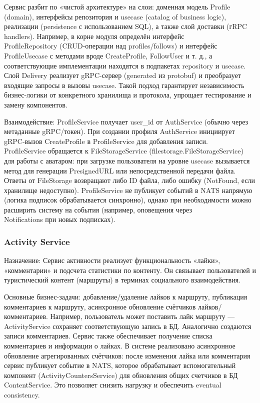 Сервис разбит по «чистой архитектуре» на слои: доменная модель Profile (domain), интерфейсы репозитория и usecase (catalog of business logic), реализации (persistence с использованием SQL), а также слой доставки (гRPC handlers). Например, в корне модуля определён интерфейс \\ ProfileRepository (CRUD-операции над profiles/follows) и интерфейс ProfileUsecase с методами вроде CreateProfile, FollowUser и т. д., а соответствующие имплементации находятся в подпакетах repository и usecase. Слой Delivery реализует gRPC-сервер (generated из protobuf) и преобразует входящие запросы в вызовы usecase. Такой подход гарантирует независимость бизнес-логики от конкретного хранилища и протокола, упрощает тестирование и замену компонентов.

Взаимодействие: ProfileService получает user\_id от AuthService (обычно через метаданные gRPC/токен). При создании профиля AuthService инициирует gRPC-вызов CreateProfile в ProfileService для добавления записи. \\ ProfileService обращается к FileStorageService (filestorage.FileStorageService) для работы с аватаром: при загрузке пользователя на уровне usecase вызывается метод для генерации PresignedURL или непосредственной передачи файла. Ответы от FileStorage возвращают либо ID файла, либо ошибку (NotFound, если хранилище недоступно). ProfileService не публикует событий в NATS напрямую (логика подписок обрабатывается синхронно), однако при необходимости можно расширить систему на события (например, оповещения через \\ Notifications при новых подписках).

\subsubsection*{Activity Service}
Назначение: Сервис активности реализует функциональность «лайки», «комментарии» и подсчета статистики по контенту. Он связывает пользователей и туристический контент (маршруты) в терминах социального взаимодействия.

Основные бизнес-задачи: добавление/удаление лайков к маршруту, публикация комментариев к маршруту, асинхронное обновление счётчиков лайков/комментариев. Например, пользователь может поставить лайк маршруту — ActivityService сохраняет соответствующую запись в БД. Аналогично создаются записи комментариев. Сервис также обеспечивает получение списка комментариев и информации о лайках. В системе реализовано асинхронное обновление агрегированных счётчиков: после изменения лайка или комментария сервис публикует событие в NATS, которое обрабатывает вспомогательный компонент (ActivityCountersService) для обновления общих счетчиков в БД ContentService. Это позволяет снизить нагрузку и обеспечить eventual consistency.

